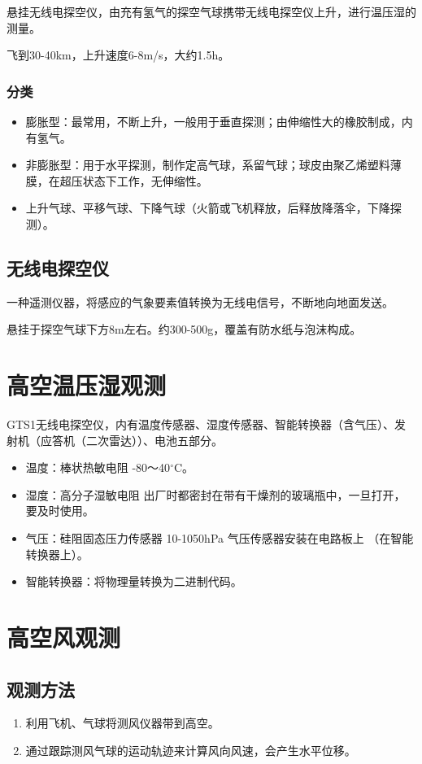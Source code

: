 \documentclass[UTF8,11pt]{ctexbook}
\begin{document}
悬挂无线电探空仪，由充有氢气的探空气球携带无线电探空仪上升，进行温压湿的测量。

飞到30-40km，上升速度6-8m/s，大约1.5h。

\subsubsection{分类}
\begin{itemize}
    \item 膨胀型：最常用，不断上升，一般用于垂直探测；由伸缩性大的橡胶制成，内有氢气。
    \item 非膨胀型：用于水平探测，制作定高气球，系留气球；球皮由聚乙烯塑料薄膜，在超压状态下工作，无伸缩性。
    \item 上升气球、平移气球、下降气球（火箭或飞机释放，后释放降落伞，下降探测）。
\end{itemize}

\subsection{无线电探空仪}

一种遥测仪器，将感应的气象要素值转换为无线电信号，不断地向地面发送。

悬挂于探空气球下方8m左右。约300-500g，覆盖有防水纸与泡沫构成。

\section{高空温压湿观测}

GTS1无线电探空仪，内有温度传感器、湿度传感器、智能转换器（含气压）、发射机（应答机（二次雷达））、电池五部分。
\begin{itemize}
    \item 温度：棒状热敏电阻 -80～40\(^\circ\mathrm{C}\)。
    \item 湿度：高分子湿敏电阻 出厂时都密封在带有干燥剂的玻璃瓶中，一旦打开，要及时使用。
    \item 气压：硅阻固态压力传感器 10-1050hPa 气压传感器安装在电路板上 （在智能转换器上）。
    \item 智能转换器：将物理量转换为二进制代码。
\end{itemize}

\section{高空风观测}

\subsection{观测方法}
\begin{enumerate}
    \item 利用飞机、气球将测风仪器带到高空。
    \item 通过跟踪测风气球的运动轨迹来计算风向风速，会产生水平位移。
\end{enumerate}
\end{document}
